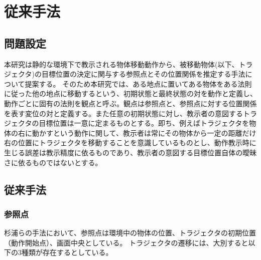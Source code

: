 ﻿%
\chapter{従来手法}

\section{問題設定}

本研究は静的な環境下で教示される物体移動動作から、被移動物体(以下、トラジェクタ)の目標位置の決定に関与する参照点とその位置関係を推定する手法について提案する。
そのため本研究では、ある地点に置いてある物体をある法則に従った他の地点に移動するという、初期状態と最終状態の対を動作と定義し、動作ごとに固有の法則を観点と呼ぶ。観点は参照点と、参照点に対する位置関係を表す変位の対と定義する。また任意の初期状態に対し、教示者の意図するトラジェクタの目標位置は一意に定まるものとする。即ち、例えばトラジェクタを物体の右に動かすという動作に関して、教示者は常にその物体から一定の距離だけ右の位置にトラジェクタを移動することを意識しているものとし、動作教示時に生じる誤差は教示精度に依るものであり、教示者の意図する目標位置自体の曖昧さに依るものではないとする。

\section{従来手法}

\subsection{参照点}

杉浦ら\cite{sugiura}の手法において、参照点は環境中の物体の位置、トラジェクタの初期位置（動作開始点）、画面中央としている。
トラジェクタの遷移には、大別すると以下の3種類が存在するとしている。

